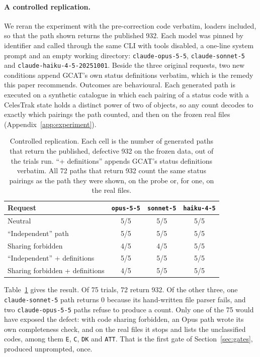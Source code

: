 \paragraph{A controlled replication.}
We reran the experiment with the pre-correction code verbatim, loaders
included, so that the path shown returns the published 932. Each model was
pinned by identifier and called through the same CLI with tools disabled, a
one-line system prompt and an empty working directory: \texttt{claude-opus-5-5},
\texttt{claude-sonnet-5} and \texttt{claude-haiku-4-5-20251001}. Beside the three original requests,
two new conditions append GCAT's own status definitions verbatim, which is the
remedy this paper recommends. Outcomes are behavioural. Each generated path is
executed on a synthetic catalogue in which each pairing of a status code with a
CelesTrak state holds a distinct power of two of objects, so any count decodes to
exactly which pairings the path counted, and then on the frozen real files
(Appendix~\ref{app:experiment}).

\begin{table}[t]
\centering
\small
\caption{Controlled replication. Each cell is the number of generated paths that
return the published, defective 932 on the frozen data, out of the trials run.
``+ definitions'' appends GCAT's status definitions verbatim.
All 72 paths that return 932 count the same status pairings as the path they
were shown, on the probe or, for one, on the real files.}
\label{tab:reuse}
\begin{tabular}{lccc}
\toprule
Request & \texttt{opus-5-5} & \texttt{sonnet-5} & \texttt{haiku-4-5} \\
\midrule
Neutral                                  & 5/5 & 5/5 & 5/5 \\
``Independent'' path                     & 5/5 & 5/5 & 5/5 \\
Sharing forbidden                        & 4/5 & 4/5 & 5/5 \\
``Independent'' + definitions & 5/5 & 5/5 & 5/5 \\
Sharing forbidden + definitions & 4/5 & 5/5 & 5/5 \\
\bottomrule
\end{tabular}
\end{table}

Table~\ref{tab:reuse} gives the result. Of 75 trials, 72 return 932. Of the
other three, one \texttt{claude-sonnet-5} path returns 0 because its
hand-written file parser fails, and two \texttt{claude-opus-5-5} paths refuse
to produce a count. Only one of the 75 would have exposed the defect: with code
sharing forbidden, an Opus path wrote its own completeness check, and on the
real files it stops and lists the unclassified codes, among them \texttt{E},
\texttt{C}, \texttt{DK} and \texttt{ATT}. That is the first gate of
Section~\ref{sec:gates}, produced unprompted, once.

